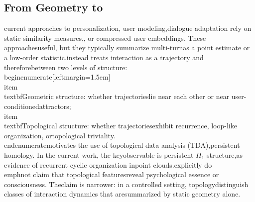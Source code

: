 \documentclass[11pt]{article}
\begin{document}
\subsection {From Geometry to\nTopology}\n\nMany current approaches to personalization, user modeling,\nand dialogue adaptation rely on static similarity measures,\nclustering, or compressed user embeddings. These approaches\nare useful, but they typically summarize multi-turn\ninteraction as a point estimate or a low-order statistic.\n\nLEM instead treats interaction as a trajectory and therefore\ndistinguishes between two levels of structure:\n\\begin{enumerate}[leftmargin=1.5em]\n  \\item \\textbf{Geometric structure}: whether trajectories\n        lie near each other or near user-conditioned\n        attractors;\n  \\item \\textbf{Topological structure}: whether trajectories\n        exhibit recurrence, loop-like organization, or\n        topological triviality.\n\\end{enumerate}\n\nThis motivates the use of topological data analysis (TDA),\nespecially persistent homology. In the current work, the key\ntopological observable is persistent $H_1$ structure,\ninterpreted as evidence of recurrent cyclic organization in\ntrajectory point clouds.\n\nWe explicitly do \\emph{not} claim that topological features\ndirectly reveal psychological essence or consciousness. The\nintended claim is narrower: in a controlled setting, topology\ncan distinguish classes of interaction dynamics that are\npoorly summarized by static geometry alone.\n\n%
\end{document}

